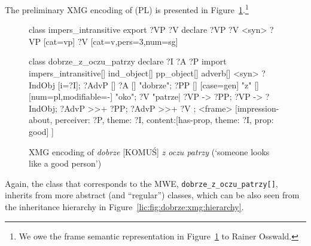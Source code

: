 \documentclass[output=paper]{langsci/langscibook}
\begin{document}
The preliminary XMG encoding of (PL)  is presented in Figure~\ref{lic:fig:dobrze:xmg}.\footnote{We owe the frame semantic representation in Figure~\ref{lic:fig:dobrze:xmg} to Rainer Osswald.}

\begin{figure}[H]
\begin{xmg}
class impers_intransitive
export ?VP ?V
declare ?VP ?V
{ <syn>{
    ?VP [cat=vp] { ?V [cat=v,pers=3,num=sg] }}}

class dobrze_z_oczu_patrzy
declare ?I ?A ?P
import impers_intransitive[] ind_object[] pp_object[] adverb[] 
{ <syn> {
    ?IndObj [i=?I];
    ?AdvP [] { ?A [] "dobrze"};
    ?PP [] { [case=gen] "z"
      [] { 
        [num=pl,modifiable=-] "oko"}};   
    ?V "patrze|%
    ?VP -> ?PP;
    ?VP -> ?IndObj;
    ?AdvP >>+ ?PP;
    ?AdvP >>+ ?V };
  <frame> {
    [impression-about,
     perceiver: ?P,
     theme: ?I,
     content:[has-prop,
              theme: ?I,
              prop: good]
    ]} 
}
\end{xmg}
  \caption{XMG encoding of \textit{dobrze} [KOMUŚ] \textit{z oczu patrzy} (`someone looks like a good person') }
  \label{lic:fig:dobrze:xmg} 
\end{figure}

Again, the class that corresponds to the MWE, \texttt{dobrze\_z\_oczu\_patrzy[]}, inherits from more abstract (and ``regular'') classes, which can be also seen from the inheritance hierarchy in Figure~\ref{lic:fig:dobrze:xmg:hierarchy}.
\end{document}
